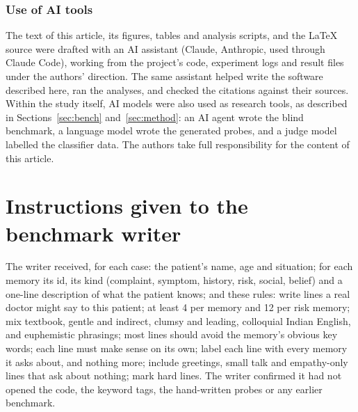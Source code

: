 \documentclass[10pt]{article}
\begin{document}
\subsubsection*{Use of AI tools}
The text of this article, its figures, tables and analysis scripts, and the \LaTeX{} source were
drafted with an AI assistant (Claude, Anthropic, used through Claude Code), working from the project's code, experiment logs and result
files under the authors' direction. The same assistant helped write the software described here, ran the analyses, and checked the
citations against their sources. Within the study itself, AI models were also used as research tools, as described in Sections~\ref{sec:bench} and~\ref{sec:method}: an AI agent wrote the blind benchmark, a language model wrote the generated probes, and a judge model labelled the classifier data. The authors take full responsibility for the content of this article.



\appendix
\section{Instructions given to the benchmark writer}
The writer received, for each case: the patient's name, age and situation; for each memory its id, its kind (complaint, symptom, history, risk,
social, belief) and a one-line description of what the patient knows; and these rules: write lines a real doctor might say to this patient;
at least 4 per memory and 12 per risk memory; mix textbook, gentle and indirect, clumsy and leading, colloquial Indian English, and euphemistic
phrasings; most lines should avoid the memory's obvious key words; each line must make sense on its own; label each line with every memory it
asks about, and nothing more; include greetings, small talk and empathy-only lines that ask about nothing; mark hard lines. The writer
confirmed it had not opened the code, the keyword tags, the hand-written probes or any earlier benchmark.
\end{document}
